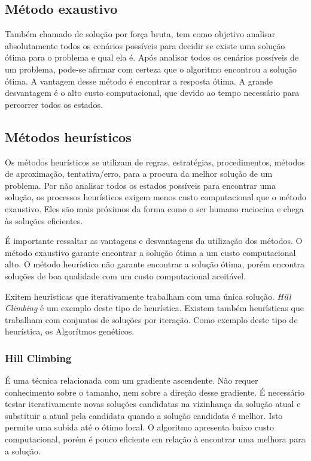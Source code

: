\documentclass[tc,twoside]{iiufrgs}
\begin{document}
\subsection{Método exaustivo}

Também chamado de solução por força bruta, tem como objetivo analisar absolutamente todos os cenários possíveis para decidir se existe uma solução ótima para o problema e qual ela é. Após analisar todos os cenários possíveis de um problema, pode-se afirmar com certeza que o algoritmo encontrou a solução ótima. A vantagem desse método é encontrar a resposta ótima. A grande desvantagem é o alto custo computacional, que devido ao tempo necessário para percorrer todos os estados. \cite{junior2008proposta} %

\subsection{Métodos heurísticos}

Os métodos heurísticos se utilizam de regras, estratégias, procedimentos, métodos de aproximação, tentativa/erro, para a procura da melhor solução de um problema. Por não analisar todos os estados possíveis para encontrar uma solução, os processos heurísticos exigem menos custo computacional que o método exaustivo. Eles são mais próximos da forma como o ser humano raciocina e chega às soluções eficientes. \cite {junior2008proposta} %

É importante ressaltar as vantagens e desvantagens da utilização dos métodos. O método exaustivo garante encontrar a solução ótima a um custo computacional alto. O método heurístico não garante encontrar a solução ótima, porém encontra soluções de boa qualidade com um custo computacional aceitável. \cite{luke2009metaheuristics} %

Exitem heurísticas que iterativamente trabalham com uma única solução. \textit{Hill Climbing} é um exemplo deste tipo de heurística. Existem também heurísticas que trabalham com conjuntos de soluções por iteração. Como exemplo deste tipo de heurística, os Algorítmos genéticos. \cite{luke2009metaheuristics}%

\subsubsection{Hill Climbing}

É uma técnica relacionada com um gradiente ascendente. Não requer conhecimento sobre o tamanho, nem sobre a direção desse gradiente. É necessário testar iterativamente novas soluções candidatas na vizinhança da solução atual e substituir a atual pela candidata quando a solução candidata é melhor. Isto permite uma subida até o ótimo local. O algoritmo apresenta baixo custo computacional, porém é pouco eficiente em relação à encontrar uma melhora para a solução. \cite{luke2009metaheuristics} %
\end{document}
